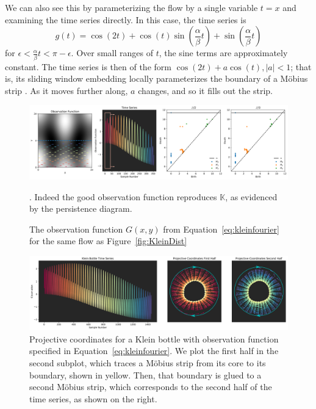 \documentclass[11pt]{article}
\theoremstyle{definition}
\theoremstyle{remark}
\begin{document}
    We can also see this by parameterizing the flow by a single variable $t = x$ and examining the time series directly.  In this case, the time series is
    \begin{equation}
    g(t) = \cos(2t) + \cos(t) \sin \left( \frac{\alpha}{\beta} t \right) + \sin \left( \frac{\alpha}{\beta} t \right)
    \end{equation}
    for $\epsilon < \frac{\alpha}{\beta} t < \pi - \epsilon$.  Over small ranges of $t$, the sine terms are approximately constant.  The time series is then of the form $\cos(2t) + a \cos(t), |a| < 1$; that is, its sliding window embedding locally parameterizes the boundary of a M\"{o}bius strip \cite{perea2015sliding}.  As it moves further along, $a$ changes, and so it fills out the strip.

    \begin{figure}[!htb]
        \centering
        \includegraphics[width=\textwidth]{KleinFourier.png}
        \caption{The observation function $G(x,y)$ from Equation~\ref{eq:kleinfourier} for the same flow as Figure~\ref{fig:KleinDist}}. Indeed the good observation function reproduces $\mathbb{K}$, as evidenced by the persistence diagram.
    \end{figure}

    \begin{figure}[!htb]
        \label{fig:eyesoftheworld}
        \centering
        \includegraphics[width=\textwidth]{KleinProj.png}
        \caption{Projective coordinates for a Klein bottle with observation function specified in Equation~\ref{eq:kleinfourier}.  We plot the first half in the second subplot, which traces a M\"{o}bius strip from its core to its boundary, shown in yellow.  Then, that boundary is glued to a second M\"{o}bius strip, which corresponds to the second half of the time series, as shown on the right.}
    \end{figure}
\end{document}
